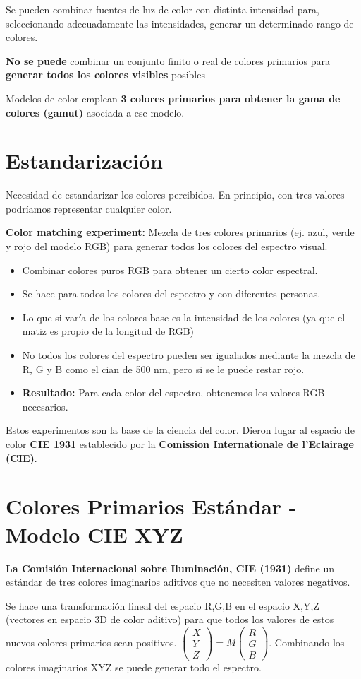 Se pueden combinar fuentes de luz de color con distinta intensidad para, seleccionando adecuadamente las intensidades, generar un determinado rango de colores.

\textbf{No se puede} combinar un conjunto finito o real de colores primarios para \textbf{generar todos los colores visibles} posibles

Modelos de color emplean \textbf{3 colores primarios para obtener la gama de colores (gamut)} asociada a ese modelo.

\section{Estandarización}
Necesidad de estandarizar los colores percibidos. En principio, con tres valores podríamos representar cualquier color.

\textbf{Color matching experiment:} Mezcla de tres colores primarios (ej. azul, verde y rojo del modelo RGB) para generar todos los colores del espectro visual.
\begin{itemize}
    \item Combinar colores puros RGB para obtener un cierto color espectral.
    \item Se hace para todos los colores del espectro y con diferentes personas.
    \item Lo que si varía de los colores base es la intensidad de los colores (ya que el matiz es propio de la longitud de RGB)
    \item No todos los colores del espectro pueden ser igualados mediante la mezcla de R, G y B como el cian de 500 nm, pero si se le puede restar rojo.
    \item \textbf{Resultado:} Para cada color del espectro, obtenemos los valores RGB necesarios.
\end{itemize}

Estos experimentos son la base de la ciencia del color. Dieron lugar al espacio de color \textbf{CIE 1931} establecido por la \textbf{Comission Internationale de l'Eclairage (CIE)}.

\section{Colores Primarios Estándar - Modelo CIE XYZ}
\textbf{La Comisión Internacional sobre Iluminación, CIE (1931)} define un estándar de tres colores imaginarios aditivos que no necesiten valores negativos. 

Se hace una transformación lineal del espacio R,G,B en el espacio X,Y,Z (vectores en espacio 3D de color aditivo) para que todos los valores de estos nuevos colores primarios sean positivos. $\left(\begin{matrix} X \\ Y \\ Z \end{matrix}\right)=M\left(\begin{matrix} R \\ G \\ B \end{matrix}\right)$. Combinando los colores imaginarios XYZ se puede generar todo el espectro.


